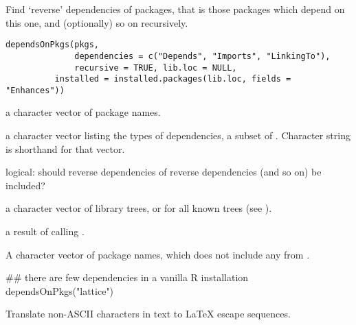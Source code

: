 %
\begin{Description}\relax
Find `reverse' dependencies of packages, that is those packages
which depend on this one, and (optionally) so on recursively.
\end{Description}
%
\begin{Usage}
\begin{verbatim}
dependsOnPkgs(pkgs,
              dependencies = c("Depends", "Imports", "LinkingTo"),
              recursive = TRUE, lib.loc = NULL,
          installed = installed.packages(lib.loc, fields = "Enhances"))
\end{verbatim}
\end{Usage}
%
\begin{Arguments}
\begin{ldescription}
\item[\code{pkgs}] a character vector of package names.
\item[\code{dependencies}] a character vector listing the types of
dependencies, a subset of .  Character string  is
shorthand for that vector.
\item[\code{recursive}] logical: should reverse dependencies of reverse
dependencies (and so on) be included?
\item[\code{lib.loc}] a character vector of \R{} library trees, or 
for all known trees (see ).
\item[\code{installed}] a result of calling .
\end{ldescription}
\end{Arguments}
%
\begin{Value}
A character vector of package names, which does not include any from
.
\end{Value}
%
\begin{Examples}
\begin{ExampleCode}
## there are few dependencies in a vanilla R installation
dependsOnPkgs("lattice")
\end{ExampleCode}
\end{Examples}
%
\begin{Description}\relax
Translate non-ASCII characters in text to LaTeX escape sequences.
\end{Description}
